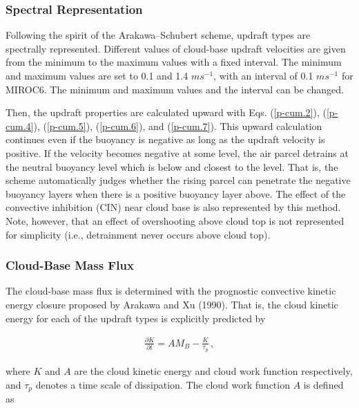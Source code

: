 \hypertarget{spectral-representation}{%
\subsubsection{Spectral Representation}\label{spectral-representation}}

Following the spirit of the Arakawa--Schubert scheme, updraft types are spectrally represented. Different values of cloud-base updraft velocities are given from the minimum to the maximum values with
a fixed interval. The minimum and maximum values are set to 0.1 and 1.4 \(m s^{-1}\), with an interval of 0.1 \(m s^{-1}\) for MIROC6. The minimum and maximum values and the interval can be changed.

Then, the updraft properties are calculated upward with Eqs. (\ref{p-cum.2}), (\ref{p-cum.4}), (\ref{p-cum.5}), (\ref{p-cum.6}), and (\ref{p-cum.7}). This upward calculation
continues even if the buoyancy is negative as long as the updraft velocity is positive. If the velocity becomes negative at some level, the air parcel detrains at the neutral buoyancy level which is
below and closest to the level. That is, the scheme automatically judges whether the rising parcel can penetrate the negative buoyancy layers when there is a positive buoyancy layer above. The effect
of the convective inhibition (CIN) near cloud base is also represented by this method. Note, however, that an effect of overshooting above cloud top is not represented for simplicity (i.e.,
detrainment never occurs above cloud top).

\hypertarget{cloud-base-mass-flux}{%
\subsubsection{Cloud-Base Mass Flux}\label{cloud-base-mass-flux}}

The cloud-base mass flux is determined with the prognostic convective kinetic energy closure proposed by Arakawa and Xu (1990). That is, the cloud kinetic energy for each of the updraft types is
explicitly predicted by

\begin{eqnarray}
 \frac{\partial K}{\partial t} = AM_B - \frac{K}{\tau_p}\,,  \label{p-cum.8}
\end{eqnarray}

where \(K\) and \(A\) are the cloud kinetic energy and cloud work function respectively, and \(\tau_p\) denotes a time scale of dissipation. The cloud work function \(A\) is defined as


